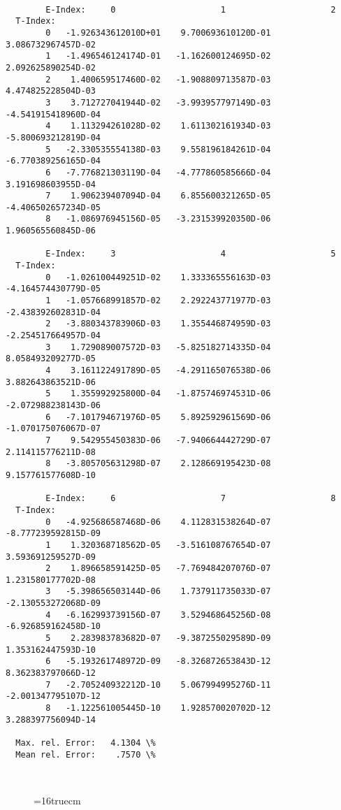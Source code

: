\documentclass[12pt,dvipdfmx]{article}
\begin{document}
\begin{small}\begin{verbatim}

        E-Index:     0                     1                     2
  T-Index:
        0   -1.926343612010D+01    9.700693610120D-01    3.086732967457D-02
        1   -1.496546124174D-01   -1.162600124695D-02    2.092625890254D-02
        2    1.400659517460D-02   -1.908809713587D-03    4.474825228504D-03
        3    3.712727041944D-02   -3.993957797149D-03   -4.541915418960D-04
        4    1.113294261028D-02    1.611302161934D-03   -5.800693212819D-04
        5   -2.330535554138D-03    9.558196184261D-04   -6.770389256165D-04
        6   -7.776821303119D-04   -4.777860585666D-04    3.191698603955D-04
        7    1.906239407094D-04    6.855600321265D-05   -4.406502657234D-05
        8   -1.086976945156D-05   -3.231539920350D-06    1.960565560845D-06

        E-Index:     3                     4                     5
  T-Index:
        0   -1.026100449251D-02    1.333365556163D-03   -4.164574430779D-05
        1   -1.057668991857D-02    2.292243771977D-03   -2.438392602831D-04
        2   -3.880343783906D-03    1.355446874959D-03   -2.254517664957D-04
        3    1.729089007572D-03   -5.825182714335D-04    8.058493209277D-05
        4    3.161122491789D-05   -4.291165076538D-06    3.882643863521D-06
        5    1.355992925800D-04   -1.875746974531D-06   -2.072988238143D-06
        6   -7.101794671976D-05    5.892592961569D-06   -1.070175076067D-07
        7    9.542955450383D-06   -7.940664442729D-07    2.114115776211D-08
        8   -3.805705631298D-07    2.128669195423D-08    9.157761577608D-10

        E-Index:     6                     7                     8
  T-Index:
        0   -4.925686587468D-06    4.112831538264D-07   -8.777239592815D-09
        1    1.320368718562D-05   -3.516108767654D-07    3.593691259527D-09
        2    1.896658591425D-05   -7.769484207076D-07    1.231580177702D-08
        3   -5.398656503144D-06    1.737911735033D-07   -2.130553272068D-09
        4   -6.162993739156D-07    3.529468645256D-08   -6.926859162458D-10
        5    2.283983783682D-07   -9.387255029589D-09    1.353162447593D-10
        6   -5.193261748972D-09   -8.326872653843D-12    8.362383797066D-12
        7   -2.705240932212D-10    5.067994995276D-11   -2.001347795107D-12
        8   -1.122561005445D-10    1.928570020702D-12    3.288397756094D-14

  Max. rel. Error:   4.1304 \%
  Mean rel. Error:    .7570 \%



\end{verbatim}\end{small}
\begin{figure} \label{7.2b}
\epsfxsize=16truecm
\end{figure}
\newpage
\end{document}
